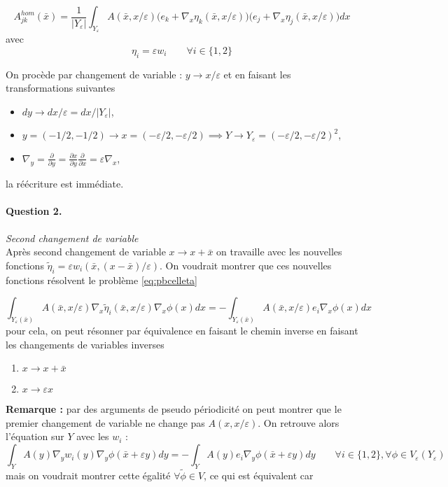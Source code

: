 \documentclass[11pt]{article}
\newcommand{\Ah}{A^{hom}}
\newcommand{\bx}{\bar{x}}
\newcommand{\teta}{\tilde{\eta}}
\newcommand{\tphi}{\tilde{\phi}}
\newcommand{\Ye}{Y_\varepsilon}
\newcommand{\question}[2]{\paragraph{Question #1.}\textit{#2} \\}
\begin{document}
\begin{equation}
  \label{eq:AhomYeps}
  \Ah_{jk}(\bx) = \frac{1}{|\Ye|}
  \int_{\Ye} A(\bx, x/\varepsilon) \big(e_k+\nabla_x \eta_k(\bx, x/\varepsilon)\big)\big(e_j+\nabla_x \eta_j(\bx, x/\varepsilon)\big) dx
\end{equation}
avec 
\[
  \eta_i = \varepsilon w_i \qquad \forall i \in \{1,2\}
\]

On procède par changement de variable : $ y \rightarrow x/\varepsilon $ et en faisant les transformations suivantes
\begin{itemize}
\item $dy \rightarrow dx/\varepsilon = dx/|\Ye|$,
\item $y=(-1/2, -1/2) \rightarrow x=(-\varepsilon/2, -\varepsilon/2) \implies Y \rightarrow \Ye = (-\varepsilon/2, -\varepsilon/2)^2$,
\item $\nabla_y = \frac{\partial}{\partial y} = \frac{\partial x}{\partial y}\frac{\partial}{\partial x} = \varepsilon \nabla_x $,
\end{itemize}
la réécriture est immédiate.

\question{2}{Second changement de variable}
Après second changement de variable $x\rightarrow x +\bx$ on travaille avec les nouvelles fonctions $\teta_i = \varepsilon w_i(\bx, (x-\bx)/\varepsilon)$.
On voudrait montrer que ces nouvelles fonctions résolvent le problème \autoref{eq:pbcelleta}

\begin{equation}
  \label{eq:pbcellteta}
  \int_{\Ye(\bx)} A(\bx, x/\varepsilon)\nabla_x \teta_i(\bx, x/\varepsilon) \nabla_x \phi(x) dx =
  - \int_{\Ye(\bx)} A(\bx, x/\varepsilon) e_i \nabla_x \phi(x) dx
\end{equation}
pour cela, on peut résonner par équivalence en faisant le chemin inverse en faisant les changements de variables inverses
\begin{enumerate}
\item $x\rightarrow x+\bx$
\item $x\rightarrow \varepsilon x$
\end{enumerate}
\textbf{Remarque : }par des arguments de pseudo périodicité on peut montrer que le premier changement de variable ne change pas $A(x, x/\varepsilon)$.
On retrouve alors l'équation sur $Y$ avec les $w_i$ :
\[
    \int_{Y} A(y)\nabla_y w_i(y) \nabla_y \phi(\bx+\varepsilon y) dy =
  - \int_{Y} A(y) e_i \nabla_y \phi(\bx+\varepsilon y) dy \qquad \forall i \in \{1, 2\}, \forall \phi\in V_\varepsilon(\Ye)
\]
mais on voudrait montrer cette égalité $\forall \tphi \in V$, ce qui est équivalent car
\end{document}
